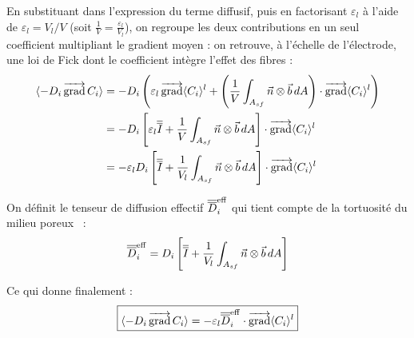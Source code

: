 En substituant dans l'expression du terme diffusif, puis en factorisant
$\varepsilon_l$ à l'aide de $\varepsilon_l = V_l/V$ (soit $\tfrac{1}{V} = \tfrac{\varepsilon_l}{V_l}$),
on regroupe les deux contributions en un seul coefficient multipliant le
gradient moyen : on retrouve, à l'échelle de l'électrode, une loi de Fick dont
le coefficient intègre l'effet des fibres :
\begin{align}
\langle -D_i \mathop{\overrightarrow{\operatorname{grad}}}\nolimits C_i \rangle
&= -D_i \left(\varepsilon_l \mathop{\overrightarrow{\operatorname{grad}}}\nolimits\langle C_i \rangle^l + \left(\frac{1}{V}\int_{A_{sf}} \vec{n}\otimes\vec{b}\, dA\right)\cdot \mathop{\overrightarrow{\operatorname{grad}}}\nolimits\langle C_i \rangle^l \right) \notag\\
&= -D_i \left[\varepsilon_l \overline{\overline{I}} + \frac{1}{V}\int_{A_{sf}} \vec{n}\otimes\vec{b}\, dA \right]\cdot\mathop{\overrightarrow{\operatorname{grad}}}\nolimits\langle C_i \rangle^l \notag\\
&= -\varepsilon_l D_i \left[ \overline{\overline{I}} + \frac{1}{V_l}\int_{A_{sf}} \vec{n}\otimes\vec{b}\, dA \right]\cdot\mathop{\overrightarrow{\operatorname{grad}}}\nolimits\langle C_i \rangle^l
\end{align}

On définit le tenseur de diffusion effectif $\overline{\overline{D}}_i^{\mathrm{eff}}$ qui tient compte
de la tortuosité du milieu poreux~\cite{whitakerMethodVolumeAveraging1999} :
\begin{equation}
\overline{\overline{D}}_i^{\mathrm{eff}} = D_i \left[ \overline{\overline{I}} + \frac{1}{V_l}\int_{A_{sf}} \vec{n}\otimes\vec{b}\, dA \right]
\end{equation}

Ce qui donne finalement :
\begin{equation}
\boxed{\langle -D_i \mathop{\overrightarrow{\operatorname{grad}}}\nolimits C_i \rangle = -\varepsilon_l \overline{\overline{D}}_i^{\mathrm{eff}}\cdot\mathop{\overrightarrow{\operatorname{grad}}}\nolimits\langle C_i \rangle^l}
\label{eq:diff_eff}
\end{equation}

